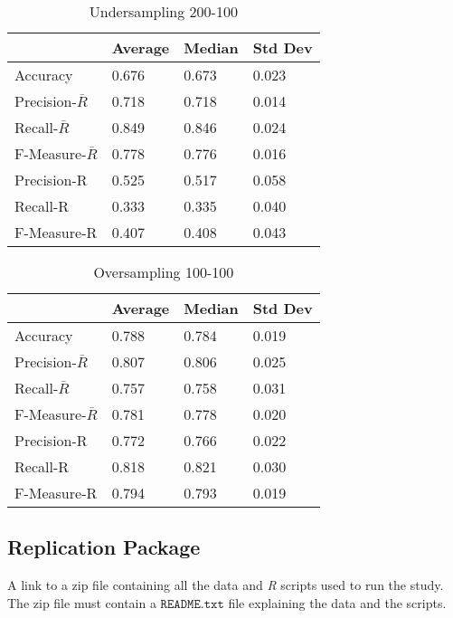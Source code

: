 \documentclass[sigconf,review]{acmart}
\begin{document}
	\begin{table}[h]
	\caption{Undersampling 200-100} \label{table:Undersampling200}
		\begin{tabular}{llll}
		\hline
		\hline
		\multicolumn{1}{c}{}
		& \multicolumn{1}{c}{Average}
		&	\multicolumn{1}{c}{Median}        
		& 	\multicolumn{1}{c}{Std Dev}\\
		\hline
		Accuracy      & 0.676 &0.673 &0.023    \\
		\hline
		Precision-$\bar{R}$  &0.718 &0.718 &0.014     \\
		Recall-$\bar{R}$ 	&0.849 &0.846 &0.024\\
		F-Measure-$\bar{R}$    & 0.778 &0.776 &0.016\\
		\hline
		Precision-R          & 0.525	&0.517	&0.058\\
		Recall-R & 0.333 &0.335 &0.040\\
		F-Measure-R    &0.407	&0.408	&0.043\\
		\hline
		\end{tabular}
	\end{table}


	\begin{table}[h]
	\caption{Oversampling 100-100} \label{table:Oversampling}
		\begin{tabular}{llll}
		\hline
		\hline
		\multicolumn{1}{c}{}
		& \multicolumn{1}{c}{Average}
		&	\multicolumn{1}{c}{Median}        
		& 	\multicolumn{1}{c}{Std Dev}\\
		\hline
		Accuracy      & 0.788 &0.784 &0.019    \\
		\hline
		Precision-$\bar{R}$  &0.807	&0.806 &0.025    \\
		Recall-$\bar{R}$ 	&0.757 &0.758 &0.031\\
		F-Measure-$\bar{R}$    & 0.781	&0.778	&0.020\\
		\hline
		Precision-R          & 0.772	&0.766	&0.022\\
		Recall-R & 0.818	&0.821	&0.030\\
		F-Measure-R    &0.794	&0.793	&0.019\\
		\hline
		\end{tabular}

	\end{table}

\subsection{Replication Package}
A link to a zip file containing all the data and \emph{R} scripts used to run the study. The zip file must contain a $\mathtt{README.txt}$ file explaining the data and the scripts.
\end{document}
